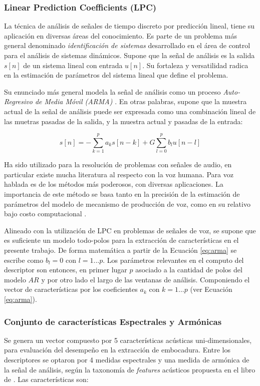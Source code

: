 \documentclass{article}
\begin{document}
\subsubsection{Linear Prediction Coefficients (LPC)}

La técnica de análisis de señales de tiempo discreto por predicción lineal, tiene su aplicación en diversas áreas del conocimiento. Es parte de un problema más general denominado \textit{identificación de sistemas} desarrollado en el área de control para el análisis de sistemas dinámicos. Supone que la señal de análisis es la salida $s[n]$ de un sistema lineal con entrada $u[n]$. Su fortaleza y versatilidad radica en la estimación de parámetros del sistema lineal que define el problema. 
\medskip

Su enunciado más general modela la señal de análisis como un proceso \textit{Auto-Regresivo de Media Móvil (ARMA)} \citep{makhoul1975linear}. En otras palabras, supone que la muestra actual de la señal de análisis puede ser expresada como una combinación lineal de las muetras pasadas de la salida, y la muestra actual y pasadas de la entrada: 

\begin{equation}
\label{eq:arma}
s[n]=-\sum_{k=1}^p a_ks[n-k]+G\sum_{l=0}^p b_lu[n-l]
\end{equation}

Ha sido utilizado para la resolución de problemas con señales de audio, en particular existe mucha literatura al respecto con la voz humana. Para voz hablada es de los métodos más poderosos, con diversas aplicaciones. La importancia de este método se basa tanto en la precisión de la estimación de parámetros del modelo de mecanismo de producción de voz, como en su relativo bajo costo computacional \citep[Capítulos~3 y 9]{rabiner1978digital}. 
\medskip

Alineado con la utilización de LPC en problemas de señales de voz, se supone que es suficiente un modelo todo-polos para la extracción de características en el presente trabajo. De forma matemática a partir de la Ecuación \ref{eq:arma} se escribe como $b_l=0$ con $l=1...p$. Los parámetros relevantes en el computo del descriptor son entonces, en primer lugar $p$ asociado a la cantidad de polos del modelo $AR$ y por otro lado el largo de las ventanas de análisis. Componiendo el vector de características por los coeficientes $a_k$ con $k=1...p$ (ver Ecuación \ref{eq:arma}).

\subsubsection{Conjunto de características Espectrales y Armónicas} 
Se genera un vector compuesto por 5 características acústicas uni-dimensionales, para evaluación del desempeño en la extracción de embocadura. Entre los descriptores se optaron por 4 medidas espectrales y una medida de armónica de la señal de análisis, según la taxonomía de \textit{features} acústicos propuesta en el libro de \cite{klapuri2007signal}. Las características son: 
\end{document}
